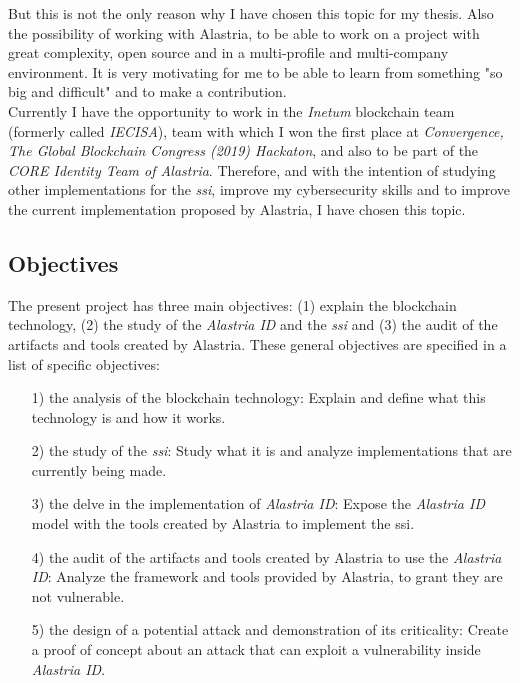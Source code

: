 But this is not the only reason why I have chosen this topic for my thesis. Also the possibility of working with Alastria, to be able to work on a project with great complexity, open source and in a multi-profile and multi-company environment. It is very motivating for me to be able to learn from something "so big and difficult" and to make a contribution.\\

Currently I have the opportunity to work in the \textit{Inetum} blockchain team (formerly called \textit{IECISA}), team with which I won the first place at \textit{Convergence, The Global Blockchain Congress (2019) Hackaton}\cite{iecisa-hackaton},  and also to be part of the \textit{CORE Identity Team of Alastria}. Therefore, and with the intention of studying other implementations for the \textit{\acrshort{ssi}}, improve my cybersecurity skills and to improve the current implementation proposed by Alastria, I have chosen this topic.

\subsection{Objectives}
The present project has three main objectives: (1) explain the blockchain technology, (2) the study of the \textit{Alastria ID} and the \textit{\acrlong{ssi}} and (3) the audit of the artifacts and tools created by Alastria. These general objectives are specified in a list of specific objectives:
\begin{itemize}
    \item[1)] the analysis of the blockchain technology: Explain and define what this technology is and how it works.
    \item[2)] the study of the \textit{\acrlong{ssi}}: Study what it is and analyze implementations that are currently being made.
    \item[3)] the delve in the implementation of \textit{Alastria ID}: Expose the \textit{Alastria ID} model with the tools created by Alastria to implement the \acrlong{ssi}.
    \item[4)] the audit of the artifacts and tools created by Alastria to use the \textit{Alastria ID}: Analyze the framework and tools provided by Alastria, to grant they are not vulnerable.
    \item[5)] the design of a potential attack and demonstration of its criticality: Create a proof of concept about an attack that can exploit a vulnerability inside \textit{Alastria ID}.
\end{itemize}

